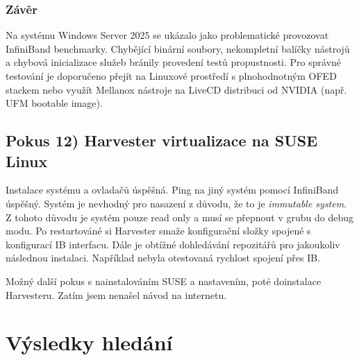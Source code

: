 \subsubsection{Závěr}  
Na systému Windows Server 2025 se ukázalo jako problematické provozovat InfiniBand benchmarky. Chybějící binární soubory, nekompletní balíčky nástrojů a chybová inicializace služeb bránily provedení testů propustnosti. Pro správné testování je doporučeno přejít na Linuxové prostředí s plnohodnotným OFED stackem nebo využít Mellanox nástroje na LiveCD distribuci od NVIDIA (např. UFM bootable image).

\newpage
\subsection{Pokus 12) Harvester virtualizace na SUSE Linux}
\nepovedeno

Instalace systému a ovladačů úspěšná. Ping na jiný systém pomocí InfiniBand úspěšný. Systém je nevhodný pro nasazení z důvodu, že to je \textit{immutable system}. Z tohoto důvodu je systém pouze read only a musí se přepnout v grubu do debug modu. Po restartováné si Harvester smaže konfigurační složky spojené s konfigurací IB interfacu. Dále je obtížné dohledávání repozitářů pro jakoukoliv následnou instalaci. Například nebyla otestovaná rychlost spojení přes IB.

Možný další pokus s nainstalováním SUSE a nastavením, poté doinstalace Harvesteru. Zatím jsem nenašel návod na internetu.

\section{Výsledky hledání}

